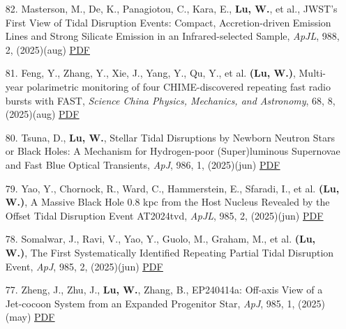 \begin{itemize}[leftmargin=0.65cm]
\vspace{-0.1cm}
\item[82.]{Masterson, M., De, K., Panagiotou, C., Kara, E., {\bf Lu, W.}, et al., {JWST's First View of Tidal Disruption Events: Compact, Accretion-driven Emission Lines and Strong Silicate Emission in an Infrared-selected Sample}, {\it ApJL}, 988, 2, (2025)(aug) \href{https://ui.adsabs.harvard.edu/abs/2025ApJ...988L..48M}{\underline{PDF}}}

\vspace{-0.1cm}
\item[81.]{Feng, Y., Zhang, Y., Xie, J., Yang, Y., Qu, Y., et al. {\bf (Lu, W.)}, {Multi-year polarimetric monitoring of four CHIME-discovered repeating fast radio bursts with FAST}, {\it Science China Physics, Mechanics, and Astronomy}, 68, 8, (2025)(aug) \href{https://ui.adsabs.harvard.edu/abs/2025SCPMA..6889511F}{\underline{PDF}}}

\vspace{-0.1cm}
\item[80.]{Tsuna, D., {\bf Lu, W.}, {Stellar Tidal Disruptions by Newborn Neutron Stars or Black Holes: A Mechanism for Hydrogen-poor (Super)luminous Supernovae and Fast Blue Optical Transients}, {\it ApJ}, 986, 1, (2025)(jun) \href{https://ui.adsabs.harvard.edu/abs/2025ApJ...986...84T}{\underline{PDF}}}

\vspace{-0.1cm}
\item[79.]{Yao, Y., Chornock, R., Ward, C., Hammerstein, E., Sfaradi, I., et al. {\bf (Lu, W.)}, {A Massive Black Hole 0.8 kpc from the Host Nucleus Revealed by the Offset Tidal Disruption Event AT2024tvd}, {\it ApJL}, 985, 2, (2025)(jun) \href{https://ui.adsabs.harvard.edu/abs/2025ApJ...985L..48Y}{\underline{PDF}}}

\vspace{-0.1cm}
\item[78.]{Somalwar, J., Ravi, V., Yao, Y., Guolo, M., Graham, M., et al. {\bf (Lu, W.)}, {The First Systematically Identified Repeating Partial Tidal Disruption Event}, {\it ApJ}, 985, 2, (2025)(jun) \href{https://ui.adsabs.harvard.edu/abs/2025ApJ...985..175S}{\underline{PDF}}}

\vspace{-0.1cm}
\item[77.]{Zheng, J., Zhu, J., {\bf Lu, W.}, Zhang, B., {EP240414a: Off-axis View of a Jet-cocoon System from an Expanded Progenitor Star}, {\it ApJ}, 985, 1, (2025)(may) \href{https://ui.adsabs.harvard.edu/abs/2025ApJ...985...21Z}{\underline{PDF}}}


\end{itemize}
